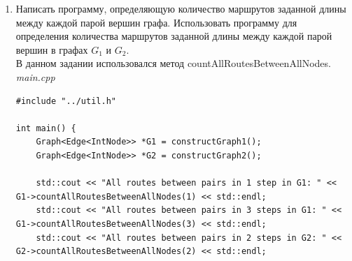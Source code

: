 \documentclass[a4paper,14pt]{extarticle}
\begin{document}
\begin{enumerate}[1.]
\begin{verbatim}
        std::cout << std::endl;
    }

    std::cout << "All routes that start in 2 in G2 and has length of 3: \n";
    r = G2->getAllRoutes((*G1)[2], 3);

    for (auto &route : r) {
        for (int i = 0; i < route.route.size(); i++) {
            if (i == route.route.size() - 1) {
                std::cout << route.route[i]->name;
            } else {
                std::cout << route.route[i]->name << ", ";
            }
        }

        std::cout << std::endl;
    }

    return 0;
}
        \end{verbatim}
        Результат выполнения программы:
        \begin{verbatim}
All routes that start in 5 in G1 and has length of 2: 
5, 1, 2
5, 1, 4
5, 1, 5
5, 1, 6
5, 1, 7
5, 2, 1
5, 2, 3
5, 2, 5
5, 2, 6
All routes that start in 2 in G2 and has length of 3:
2, 1, 2, 1
2, 1, 2, 3
2, 1, 2, 4
2, 1, 4, 1
2, 1, 4, 2
2, 1, 4, 3
2, 1, 6, 1
2, 1, 6, 3
2, 1, 6, 5
2, 1, 6, 7
2, 1, 7, 1
2, 1, 7, 6
2, 3, 2, 1
2, 3, 2, 3
2, 3, 2, 4
2, 3, 4, 1
2, 3, 4, 2
2, 3, 4, 3
2, 3, 5, 3
2, 3, 5, 6
2, 3, 6, 1
2, 3, 6, 3
2, 3, 6, 5
2, 3, 6, 7
2, 4, 1, 2
2, 4, 1, 4
2, 4, 1, 6
2, 4, 1, 7
2, 4, 2, 1
2, 4, 2, 3
2, 4, 2, 4
2, 4, 3, 2
2, 4, 3, 4
2, 4, 3, 5
2, 4, 3, 6
        \end{verbatim}

        \item Написать программу, определяющую количество маршрутов
заданной длины между каждой парой вершин графа. Использовать
программу для определения количества маршрутов заданной длины
между каждой парой вершин в графах $G_1$ и $G_2$.\\
        В данном задании использовался метод countAllRoutesBetweenAllNodes.\\
        \textit{main.cpp}
        \begin{verbatim}
#include "../util.h"

int main() {
    Graph<Edge<IntNode>> *G1 = constructGraph1();
    Graph<Edge<IntNode>> *G2 = constructGraph2();

    std::cout << "All routes between pairs in 1 step in G1: " << G1->countAllRoutesBetweenAllNodes(1) << std::endl;
    std::cout << "All routes between pairs in 3 steps in G1: " << G1->countAllRoutesBetweenAllNodes(3) << std::endl;
    std::cout << "All routes between pairs in 2 steps in G2: " << G2->countAllRoutesBetweenAllNodes(2) << std::endl;


\end{verbatim}
\end{enumerate}
\end{document}
